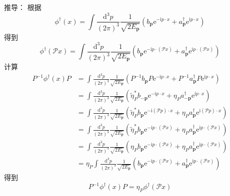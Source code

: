 推导：
根据
\begin{equation}
    \phi ^{\dagger}(x)=\int{\frac{\mathrm{d}^3p}{\left( 2\pi \right) ^3}}\frac{1}{\sqrt{2E_{\mathbf{p}}}}\left( b_{\mathbf{p}}\mathrm{e}^{-\mathrm{i}p\cdot x}+a_{\mathbf{p}}^{\dagger}\mathrm{e}^{\mathrm{i}p\cdot x} \right) 
\end{equation}
得到
\begin{equation}
    \phi ^{\dagger}(\mathcal{P} x)=\int{\frac{\mathrm{d}^3p}{\left( 2\pi \right) ^3}}\frac{1}{\sqrt{2E_{\mathbf{p}}}}\left( b_{\mathbf{p}}\mathrm{e}^{-\mathrm{i}p\cdot \left( \mathcal{P} x \right)}+a_{\mathbf{p}}^{\dagger}\mathrm{e}^{\mathrm{i}p\cdot \left( \mathcal{P} x \right)} \right) 
\end{equation}
计算
\begin{equation}
    \begin{aligned}
        P^{-1}\phi ^{\dagger}(x)P&=\int{\frac{\mathrm{d}^3p}{\left( 2\pi \right) ^3}}\frac{1}{\sqrt{2E_{\mathbf{p}}}}\left( P^{-1}b_{\mathbf{p}}P\mathrm{e}^{-\mathrm{i}p\cdot x}+P^{-1}a_{\mathbf{p}}^{\dagger}P\mathrm{e}^{\mathrm{i}p\cdot x} \right) 
\\
&=\int{\frac{\mathrm{d}^3p}{\left( 2\pi \right) ^3}}\frac{1}{\sqrt{2E_{\mathbf{p}}}}\left( \tilde{\eta}_{P}^{*}b_{-\mathbf{p}}\mathrm{e}^{-\mathrm{i}p\cdot x}+\eta _Pa_{-\mathbf{p}}^{\dagger}\mathrm{e}^{\mathrm{i}p\cdot x} \right) 
\\
&=\int{\frac{\mathrm{d}^3p}{\left( 2\pi \right) ^3}}\frac{1}{\sqrt{2E_{\mathbf{p}}}}\left( \tilde{\eta}_{P}^{*}b_{\mathbf{p}}\mathrm{e}^{-\mathrm{i}\left( \mathcal{P} p \right) \cdot x}+\eta _Pa_{\mathbf{p}}^{\dagger}\mathrm{e}^{\mathrm{i}\left( \mathcal{P} p \right) \cdot x} \right) 
\\
&=\int{\frac{\mathrm{d}^3p}{\left( 2\pi \right) ^3}}\frac{1}{\sqrt{2E_{\mathbf{p}}}}\left( \tilde{\eta}_{P}^{*}b_{\mathbf{p}}\mathrm{e}^{-\mathrm{i}p\cdot \left( \mathcal{P} x \right)}+\eta _Pa_{\mathbf{p}}^{\dagger}\mathrm{e}^{\mathrm{i}p\cdot \left( \mathcal{P} x \right)} \right) 
\\
&=\int{\frac{\mathrm{d}^3p}{\left( 2\pi \right) ^3}}\frac{1}{\sqrt{2E_{\mathbf{p}}}}\left( \eta _Pb_{\mathbf{p}}\mathrm{e}^{-\mathrm{i}p\cdot \left( \mathcal{P} x \right)}+\eta _Pa_{\mathbf{p}}^{\dagger}\mathrm{e}^{\mathrm{i}p\cdot \left( \mathcal{P} x \right)} \right) 
\\
&=\eta _P\int{\frac{\mathrm{d}^3p}{\left( 2\pi \right) ^3}}\frac{1}{\sqrt{2E_{\mathbf{p}}}}\left( b_{\mathbf{p}}\mathrm{e}^{-\mathrm{i}p\cdot \left( \mathcal{P} x \right)}+a_{\mathbf{p}}^{\dagger}\mathrm{e}^{\mathrm{i}p\cdot \left( \mathcal{P} x \right)} \right) 
    \end{aligned}
\end{equation}
得到
\begin{equation}
    P^{-1}\phi ^{\dagger}(x)P=\eta _P\phi ^{\dagger}(\mathcal{P} x)
\end{equation}









